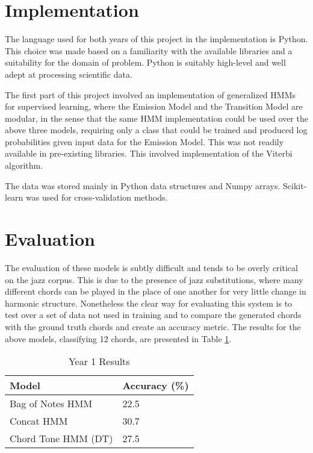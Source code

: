 \documentclass[bsc,singlespacing,logo, parskip, deptreport]{infthesis}
\begin{document}
\section{Implementation}

The language used for both years of this project in the implementation is Python. This choice was made based on a familiarity with the available libraries and a suitability for the domain of problem. Python is suitably high-level and well adept at processing scientific data.

The first part of this project involved an implementation of generalized HMMs for supervised learning, where the Emission Model and the Transition Model are modular, in the sense that the same HMM implementation could be used over the above three models, requiring only a class that could be trained and produced log probabilities given input data for the Emission Model. This was not readily available in pre-existing libraries. This involved implementation of the Viterbi algorithm.

The data was stored mainly in Python data structures and Numpy arrays. Scikit-learn was used for cross-validation methods.

\section{Evaluation}

The evaluation of these models is subtly difficult and tends to be overly critical on the jazz corpus. This is due to the presence of jazz substitutions, where many different chords can be played in the place of one another for very little change in harmonic structure. Nonetheless the clear way for evaluating this system is to test over a set of data not used in training and to compare the generated chords with the ground truth chords and create an accuracy metric. The results for the above models, classifying 12 chords, are presented in Table \ref{12}.

\begin{table}
\centering
\caption{Year 1 Results}
\label{12}
\begin{tabular}{l|l}
Model               & Accuracy (\%) \\ \hline
Bag of Notes HMM    & 22.5           \\
Concat HMM          & 30.7          \\
Chord Tone HMM (DT) & 27.5          \\
\end{tabular}
\end{table}
\end{document}
